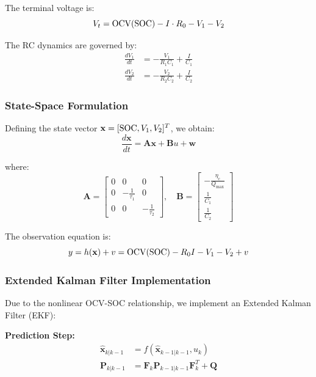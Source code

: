 The terminal voltage is:
\begin{equation}
V_t = \text{OCV}(\text{SOC}) - I \cdot R_0 - V_1 - V_2
\label{eq:terminal_voltage}
\end{equation}

The RC dynamics are governed by:
\begin{align}
\frac{dV_1}{dt} &= -\frac{V_1}{R_1 C_1} + \frac{I}{C_1} \label{eq:v1_dynamics} \\
\frac{dV_2}{dt} &= -\frac{V_2}{R_2 C_2} + \frac{I}{C_2} \label{eq:v2_dynamics}
\end{align}

\subsubsection{State-Space Formulation}

Defining the state vector $\mathbf{x} = [\text{SOC}, V_1, V_2]^T$, we obtain:
\begin{equation}
\frac{d\mathbf{x}}{dt} = \mathbf{A}\mathbf{x} + \mathbf{B}u + \mathbf{w}
\label{eq:state_space}
\end{equation}

where:
\begin{equation}
\mathbf{A} = \begin{bmatrix}
0 & 0 & 0 \\
0 & -\frac{1}{\tau_1} & 0 \\
0 & 0 & -\frac{1}{\tau_2}
\end{bmatrix}, \quad
\mathbf{B} = \begin{bmatrix}
-\frac{\eta_c}{Q_{\max}} \\
\frac{1}{C_1} \\
\frac{1}{C_2}
\end{bmatrix}
\end{equation}

The observation equation is:
\begin{equation}
y = h(\mathbf{x}) + v = \text{OCV}(\text{SOC}) - R_0 I - V_1 - V_2 + v
\label{eq:observation}
\end{equation}

\subsubsection{Extended Kalman Filter Implementation}

Due to the nonlinear OCV-SOC relationship, we implement an Extended Kalman Filter (EKF):

\textbf{Prediction Step:}
\begin{align}
\hat{\mathbf{x}}_{k|k-1} &= f(\hat{\mathbf{x}}_{k-1|k-1}, u_k) \\
\mathbf{P}_{k|k-1} &= \mathbf{F}_k \mathbf{P}_{k-1|k-1} \mathbf{F}_k^T + \mathbf{Q}
\end{align}

